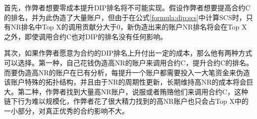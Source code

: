 首先，作弊者想要零成本提升DIP排名将不可能实现。假设作弊者想要提高合约C的排名，并为此伪造了大量账户，但由于在公式\ref{formula:dip:scs}中计算SCS时，只有NR排名中Top X的调用贡献分大于0，新伪造出来的账户NR排名将会在Top X之外，即使调用合约C也对DIP的排名没有任何影响。

其次，如果作弊者愿意为合约的DIP排名上升付出一定的成本，那么他有两种方式可以选择。第一种，自己花钱伪造高NR的账户来调用合约C，提升合约C的排名。而要伪造高NR的账户在已有分析，每提升一个账户都需要投入一大笔资金来伪造该账户特殊的拓扑结构，并且由于NR的周期性更新，长期维持高NR的成本将会巨大。第二种，作弊者找到大量高NR账户，说服或者贿赂他们来调用合约C，这种链下行为难以规模化，作弊者花了很大精力找到的高NR账户也只会占Top X中的一小部分，对真正优秀的合约影响不大。

